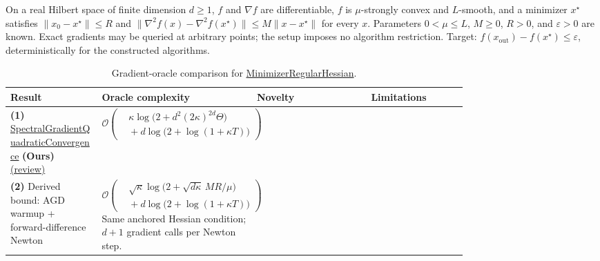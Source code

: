 \begin{table}[tp]
\centering
\caption{Gradient-oracle comparison for \href{https://github.com/k3nfalt/longtails/blob/main/LongTails/Setups/MinimizerRegularHessian.lean}{MinimizerRegularHessian}.}\label{tab:MinimizerRegularHessian}
\parbox{\linewidth}{\footnotesize On a real Hilbert space of finite dimension $d\ge1$, $f$ and $\nabla f$ are differentiable, $f$ is $\mu$-strongly convex and $L$-smooth, and a minimizer $x^\star$ satisfies $\|x_0-x^\star\|\le R$ and $\|\nabla^2 f(x)-\nabla^2 f(x^\star)\|\le M\|x-x^\star\|$ for every $x$. Parameters $0<\mu\le L$, $M\ge0$, $R>0$, and $\varepsilon>0$ are known. Exact gradients may be queried at arbitrary points; the setup imposes no algorithm restriction. Target: $f(x_{\mathrm{out}})-f(x^\star)\le\varepsilon$, deterministically for the constructed algorithms.}\par\smallskip
\begin{threeparttable}
\footnotesize
\setlength{\tabcolsep}{4pt}\renewcommand{\arraystretch}{1.25}
\begin{tabularx}{\linewidth}{@{}>{\raggedright\arraybackslash}p{0.20\linewidth}>{\raggedright\arraybackslash}p{0.32\linewidth}>{\raggedright\arraybackslash}p{0.25\linewidth}>{\raggedright\arraybackslash}X@{}}
\toprule
\textbf{Result} & \textbf{Oracle complexity} & \textbf{Novelty} & \textbf{Limitations} \\
\midrule
\textbf{(1)} \href{https://github.com/k3nfalt/longtails/blob/main/LongTails/Theorems/SpectralGradientQuadraticConvergence.lean}{Spectral\allowbreak Gradient\allowbreak Quadratic\allowbreak Convergence} \textbf{(Ours)} \href{https://github.com/k3nfalt/longtails/blob/main/scripts/reviews/SpectralGradientQuadraticConvergence.md}{(review)}
& $\mathcal{O}\!\left(\begin{aligned}&\kappa\log\!\bigl(2+d^2(2\kappa)^{2d}\Theta\bigr)\\[-2pt]&{}+d\log\!\bigl(2+\log(1+\kappa T)\bigr)\end{aligned}\right)$
& & \\
\midrule[1.2pt]
\textbf{(2)} Derived bound: AGD warmup \citep[Thm.~3.18]{mrhBubeck2015v2} + forward-difference Newton
& $\mathcal{O}\!\left(\begin{aligned}&\sqrt\kappa\log\!\bigl(2+\sqrt{d\kappa}\,MR/\mu\bigr)\\[-2pt]&{}+d\log\!\bigl(2+\log(1+\kappa T)\bigr)\end{aligned}\right)$\newline Same anchored Hessian condition; $d+1$ gradient calls per Newton step.

\end{tabularx}
\end{threeparttable}
\end{table}
